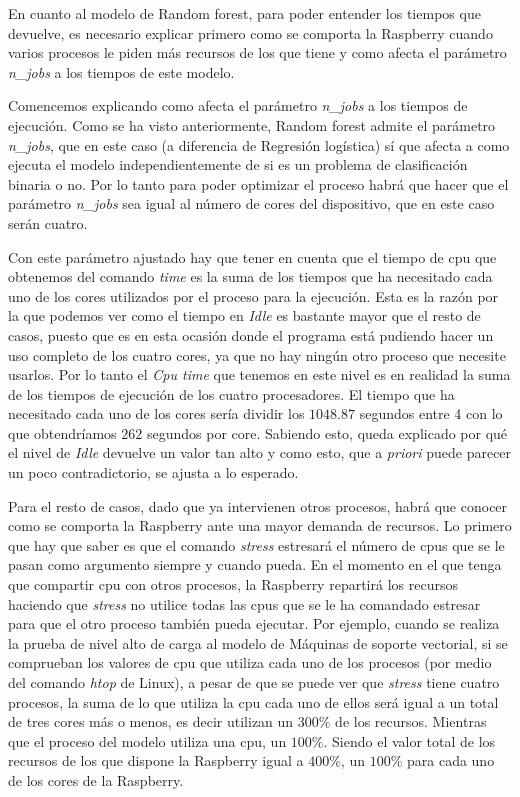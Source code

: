 \documentclass[a4paper, 12pt]{book}
\begin{document}
En cuanto al modelo de Random forest, para poder entender los tiempos que devuelve, es necesario explicar primero como se comporta la Raspberry cuando varios procesos le piden más recursos de los que tiene y como afecta el parámetro \textit{n\_jobs} a los tiempos de este modelo.

Comencemos explicando como afecta el parámetro \textit{n\_jobs} a los tiempos de ejecución. Como se ha visto anteriormente, Random forest admite el parámetro \textit{n\_jobs}, que en este caso (a diferencia de Regresión logística) sí que afecta a como ejecuta el modelo independientemente de si es un problema de clasificación binaria o no. Por lo tanto para poder optimizar el proceso habrá que hacer que el parámetro \textit{n\_jobs} sea igual al número de cores del dispositivo, que en este caso serán cuatro. 

Con este parámetro ajustado hay que tener en cuenta que el tiempo de cpu que obtenemos del comando \textit{time} es la suma de los tiempos que ha necesitado cada uno de los cores utilizados por el proceso para la ejecución. Esta es la razón por la que podemos ver como el tiempo en \textit{Idle} es bastante mayor que el resto de casos, puesto que es en esta ocasión donde el programa está pudiendo hacer un uso completo de los cuatro cores, ya que no hay ningún otro proceso que necesite usarlos. Por lo tanto el \textit{Cpu time} que tenemos en este nivel es en realidad la suma de los tiempos de ejecución de los cuatro procesadores. El tiempo que ha necesitado cada uno de los cores sería dividir los $1048.87$ segundos entre 4 con lo que obtendríamos $262$ segundos por core. Sabiendo esto, queda explicado por qué el nivel de \textit{Idle} devuelve un valor tan alto y como esto, que a \textit{priori} puede parecer un poco contradictorio, se ajusta a lo esperado.

Para el resto de casos, dado que ya intervienen otros procesos, habrá que conocer como se comporta la Raspberry ante una mayor demanda de recursos. Lo primero que hay que saber es que el comando \textit{stress} estresará el número de cpus que se le pasan como argumento siempre y cuando pueda. En el momento en el que tenga que compartir cpu con otros procesos, la Raspberry repartirá los recursos haciendo que \textit{stress} no utilice todas las cpus que se le ha comandado estresar para que el otro proceso también pueda ejecutar. Por ejemplo, cuando se realiza la prueba de nivel alto de carga al modelo de Máquinas de soporte vectorial, si se comprueban los valores de cpu que utiliza cada uno de los procesos (por medio del comando \textit{htop} de Linux), a pesar de que se puede ver que \textit{stress} tiene cuatro procesos, la suma de lo que utiliza la cpu cada uno de ellos será igual a un total de tres cores más o menos, es decir utilizan un $300\%$ de los recursos. Mientras que el proceso del modelo utiliza una cpu, un $100\%$. Siendo el valor total de los recursos de los que dispone la Raspberry igual a $400\%$, un $100\%$ para cada uno de los cores de la Raspberry.
\end{document}
